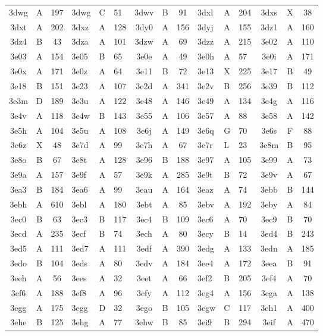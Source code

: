 \begin{longtable}{|c|c|c| a|a|a| c|c|c| a|a|a| c|c|c|}
3dwg & A & 197 & 3dwg & C & 51 & 3dwv & B & 91 & 3dxl & A & 204 & 3dxs & X & 38\\
3dxt & A & 202 & 3dxz & A & 128 & 3dy0 & A & 156 & 3dyj & A & 155 & 3dz1 & A & 160\\
3dz4 & B & 43 & 3dza & A & 101 & 3dzw & A & 69 & 3dzz & A & 215 & 3e02 & A & 110\\
3e03 & A & 154 & 3e05 & B & 65 & 3e0e & A & 49 & 3e0h & A & 57 & 3e0i & A & 171\\
3e0x & A & 171 & 3e0z & A & 64 & 3e11 & B & 72 & 3e13 & X & 225 & 3e17 & B & 49\\
3e18 & B & 151 & 3e23 & A & 107 & 3e2d & A & 341 & 3e2v & B & 256 & 3e39 & B & 112\\
3e3m & D & 189 & 3e3u & A & 122 & 3e48 & A & 146 & 3e49 & A & 134 & 3e4g & A & 116\\
3e4v & A & 118 & 3e4w & B & 143 & 3e55 & A & 106 & 3e57 & A & 88 & 3e58 & A & 142\\
3e5h & A & 104 & 3e5u & A & 108 & 3e6j & A & 149 & 3e6q & G & 70 & 3e6s & F & 88\\
3e6z & X & 48 & 3e7d & A & 99 & 3e7h & A & 67 & 3e7r & L & 23 & 3e8m & B & 95\\
3e8o & B & 67 & 3e8t & A & 128 & 3e96 & B & 188 & 3e97 & A & 105 & 3e99 & A & 73\\
3e9a & A & 157 & 3e9f & A & 57 & 3e9k & A & 285 & 3e9t & B & 72 & 3e9v & A & 67\\
3ea3 & B & 184 & 3ea6 & A & 99 & 3eau & A & 164 & 3eaz & A & 74 & 3ebb & B & 144\\
3ebh & A & 610 & 3ebl & A & 180 & 3ebt & A & 85 & 3ebv & A & 192 & 3eby & A & 84\\
3ec0 & B & 63 & 3ec3 & B & 117 & 3ec4 & B & 109 & 3ec6 & A & 70 & 3ec9 & B & 70\\
3ecd & A & 235 & 3ecf & B & 74 & 3ech & A & 80 & 3ecy & B & 14 & 3ed4 & B & 243\\
3ed5 & A & 111 & 3ed7 & A & 111 & 3edf & A & 390 & 3edg & A & 133 & 3edn & A & 185\\
3edo & B & 104 & 3eds & A & 80 & 3edv & A & 184 & 3ee4 & A & 172 & 3eea & B & 91\\
3eeh & A & 56 & 3ees & A & 32 & 3eet & A & 66 & 3ef2 & B & 205 & 3ef4 & A & 70\\
3ef6 & A & 188 & 3ef8 & A & 96 & 3efy & A & 112 & 3eg4 & A & 156 & 3ega & A & 138\\
3egg & A & 175 & 3egg & D & 32 & 3ego & B & 105 & 3egw & C & 117 & 3eh1 & A & 400\\
3ehe & B & 125 & 3ehg & A & 77 & 3ehw & B & 85 & 3ei9 & B & 294 & 3eif & A & 470\\

\end{longtable}
